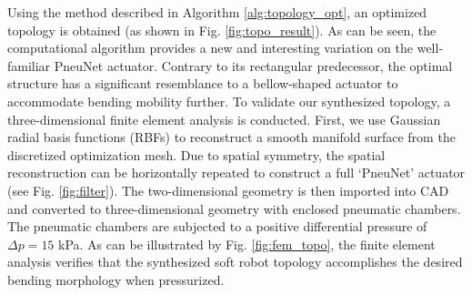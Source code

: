  Using the method described in Algorithm \ref{alg:topology_opt}, an optimized topology is obtained (as shown in Fig. \ref{fig:topo_result}). As can be seen, the computational algorithm provides a new and interesting variation on the well-familiar PneuNet actuator. Contrary to its rectangular predecessor, the optimal structure has a significant resemblance to a bellow-shaped actuator to accommodate bending mobility further. To validate our synthesized topology, a three-dimensional finite element analysis is conducted. First, we use Gaussian radial basis functions (RBFs) to reconstruct a smooth manifold surface from the discretized optimization mesh. Due to spatial symmetry, the spatial reconstruction can be horizontally repeated to construct a full `PneuNet' actuator (see Fig. \ref{fig:filter}). The two-dimensional geometry is then imported into CAD and converted to three-dimensional geometry with enclosed pneumatic chambers. The pneumatic chambers are subjected to a positive differential pressure of $\Delta p = 15$ kPa. As can be illustrated by Fig. \ref{fig:fem_topo}, the finite element analysis verifies that the synthesized soft robot topology accomplishes the desired bending morphology when pressurized.